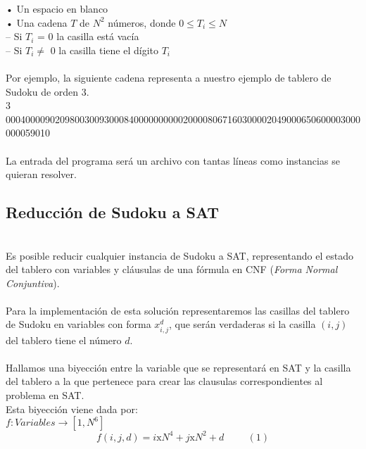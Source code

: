 \documentclass[letterpaper,12pt]{article}
\begin{document}
• Un espacio en blanco\\

• Una cadena $T$ de $N^2$ números, donde $0 \leq T_i \leq N$\\

\hspace{1cm}– Si $T_i$ = 0 la casilla está vacía\\

\hspace{1cm}– Si $T_i \neq$ 0 la casilla tiene el dígito $T_i$\\
\\
Por ejemplo, la siguiente cadena representa a nuestro ejemplo de tablero de Sudoku de orden 3.\\

\footnotesize{3 000400009020980030093000840000000000200008067160300002049000650600003000000059010}\\
\\
\normalsize
La entrada del programa será un archivo con tantas líneas como instancias se quieran resolver.

\subsection{Reducción de Sudoku a SAT}\\

Es posible reducir cualquier instancia de Sudoku a SAT, representando el estado del tablero con variables y cláusulas de una fórmula en CNF (\textit{Forma Normal Conjuntiva}).\\
\\
Para la implementación de esta solución representaremos las casillas del tablero de Sudoku en variables con forma $x^d_{i,j}$, que serán verdaderas si la casilla $(i,j)$ del tablero tiene el número $d$.\\
\\
Hallamos una biyección entre la variable que se representará en SAT y la casilla del tablero a la que pertenece para crear las clausulas correspondientes al problema en SAT.\\

Esta biyección viene dada por:\\

$f: Variables \rightarrow [1,N^6]$
\begin{equation*}
    f(i,j,d) = i \text{x} N^4 + j \text{x} N^2 + d \hspace{1cm} \label{eq:1} (1)
\end{equation*}\\
\end{document}
